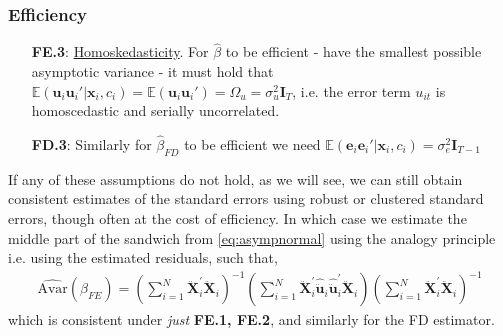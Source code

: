 \subsubsection*{Efficiency}

\begin{itemize}
    \item [\textbf{FE.3}:] \underline{Homoskedasticity}. For $\hat{\beta}$ to be efficient - have the smallest possible asymptotic variance - it must hold that $\mathbb{E}(\bm{u}_i \bm{u}_i' | \bm{x}_i, c_i) = \mathbb{E}(\bm{u}_i \bm{u}_i') = \Omega_{u} = \sigma^2_u \bm{I}_T$, i.e. the error term $u_{it}$ is homoscedastic and serially uncorrelated. 
    \item [\textbf{FD.3}:] Similarly for $\hat{\beta}_{FD}$ to be efficient we need $\mathbb{E}(\bm{e}_i \bm{e}_{i}'|\bm{x}_i, c_i) = \sigma^{2}_{e} \bm{I}_{T-1}$  
\end{itemize}
If any of these assumptions do not hold, as we will see, we can still obtain consistent estimates of the standard errors using robust or clustered standard errors, though often at the cost of efficiency. In which case we estimate the middle part of the sandwich from \eqref{eq:asympnormal} using the analogy principle i.e. using the estimated residuals, such that, 
\begin{align*}
    \hat{\text{Avar}}(\hat{\beta}_{FE}) = \left( \sum_{i=1}^N \bm{\ddot{X}}_i^\prime \bm{\ddot{X}}_i \right)^{-1} \left( \sum_{i=1}^N \bm{\ddot{X}}_i^\prime \hat{\ddot{\bm{u}}}_i \hat{\ddot{\bm{u}}}_i^\prime \bm{\ddot{X}}_i \right) \left( \sum_{i=1}^N \bm{\ddot{X}}_i^\prime \bm{\ddot{X}}_i \right)^{-1}
\end{align*} 
which is consistent under \textit{just} \textbf{FE.1, FE.2}, and similarly for the FD estimator.